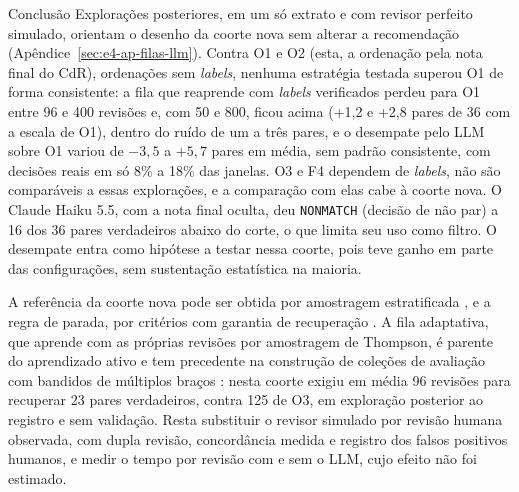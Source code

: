 \begin{chapter}{Conclusão}
Explorações posteriores, em um só extrato e com revisor perfeito simulado, orientam o desenho da coorte nova sem alterar a recomendação (Apêndice~\ref{sec:e4-ap-filas-llm}). Contra O1 e O2 (esta, a ordenação pela nota final do CdR), ordenações sem \textit{labels}, nenhuma estratégia testada superou O1 de forma consistente: a fila que reaprende com \textit{labels} verificados perdeu para O1 entre 96 e 400 revisões e, com 50 e 800, ficou acima (+1,2 e +2,8 pares de 36 com a escala de O1), dentro do ruído de um a três pares, e o desempate pelo LLM sobre O1 variou de $-3{,}5$ a $+5{,}7$ pares em média, sem padrão consistente, com decisões reais em só 8\% a 18\% das janelas. O3 e F4 dependem de \textit{labels}, não são comparáveis a essas explorações, e a comparação com elas cabe à coorte nova. O Claude Haiku 5.5, com a nota final oculta, deu \texttt{NONMATCH} (decisão de não par) a 16 dos 36 pares verdadeiros abaixo do corte, o que limita seu uso como filtro. O desempate entra como hipótese a testar nessa coorte, pois teve ganho em parte das configurações, sem sustentação estatística na maioria.

A referência da coorte nova pode ser obtida por amostragem estratificada \cite{Lam2026clerical}, e a regra de parada, por critérios com garantia de recuperação \cite{Callaghan2020stopping,Lewis2021certifying}. A fila adaptativa, que aprende com as próprias revisões por amostragem de Thompson, é parente do aprendizado ativo e tem precedente na construção de coleções de avaliação com bandidos de múltiplos braços \cite{Rahman2019bandits}: nesta coorte exigiu em média 96 revisões para recuperar 23 pares verdadeiros, contra 125 de O3, em exploração posterior ao registro e sem validação. Resta substituir o revisor simulado por revisão humana observada, com dupla revisão, concordância medida e registro dos falsos positivos humanos, e medir o tempo por revisão com e sem o LLM, cujo efeito não foi estimado.

\end{chapter}
